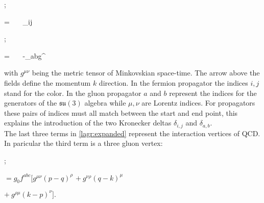 \begin{minipage}{0.4\textwidth}
\begin{center}
    ;     
\end{center}
\end{minipage}
\begin{minipage}{0.58\textwidth}
        \beq \nonumber = ~~~\delta_{ij} ~~~~~~~~~~~~~~~~~~~~~~~~~~~~~\eeq
\end{minipage} 

\begin{minipage}{0.4\textwidth}
\begin{center}
    ; 
\end{center}
\end{minipage}
\begin{minipage}{0.58\textwidth}
        \beq \nonumber = ~~~-\delta_{ab}g^{\mu\nu} ~~~~~~~~~~~~~~~~~~~~~~~~~~~~\eeq
\end{minipage}

with $g^{\mu\nu}$ being the metric tensor of Minkovskian space-time. The arrow above the fields define the momentum $k$ direction. In the fermion propagator the indices $i,j$ stand for the color. In the gluon propagator $a$ and $b$ represent the indices for the generators of the $\mathfrak{su}(3)$ algebra while $\mu,\nu$ are Lorentz indices. For propagators these pairs of indices must all match between the start and end point, this explains the introduction of the two Kronecker deltas $\delta_{i,j}$ and $\delta_{a,b}$.\\
The last three terms in \cref{lagr:expanded} represent the interaction vertices of QCD. In paricular the third term is a three gluon vertex:
\begin{center}
\begin{minipage}{0.4\textwidth}
    \hspace{2cm};
\end{minipage}
\begin{minipage}{0.58\textwidth}
    \hspace{1cm} $ = g_0 f^{abc}[g^{\mu\nu}(p-q)^\rho $ \newline
    \vspace{-0.15cm}
    \hspace{2.0cm} $+~g^{\nu\rho}(q-k)^\mu $ \newline
    
    \vspace{-0.2cm}
    \hspace{2.1cm} $+~g^{\rho\mu}(k-p)^\nu ] .$
\end{minipage}
\end{center}

